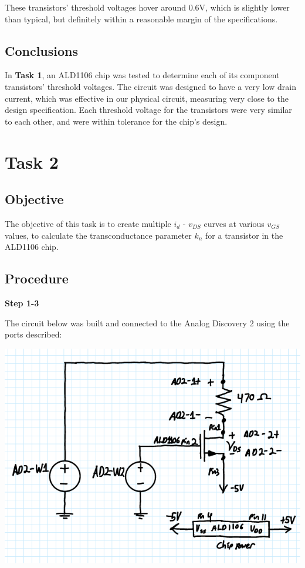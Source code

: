 \documentclass[notitlepage, 12pt]{report}  %
\begin{document}
These transistors' threshold voltages hover around 0.6V, which is slightly lower than typical, but definitely
within a reasonable margin of the specifications.\\

\subsection*{Conclusions}

\indent\indent In \textbf{Task 1}, an ALD1106 chip was tested to determine each of its component transistors' threshold voltages. 
The circuit was designed to have a very low drain current, which was effective in our physical circuit, measuring 
very close to the design specification. Each threshold voltage for the transistors were very similar to each other, 
and were within tolerance for the chip's design. \\

\section*{Task 2}

\subsection*{Objective}


\indent\indent The objective of this task is to create multiple $i_d$ - $v_{DS}$ curves at various $v_{GS}$ values, to calculate 
the transconductance parameter $k_n$ for a transistor in the ALD1106 chip.\\


\subsection*{Procedure}

\textbf{Step 1-3}

The circuit below was built and connected to the Analog Discovery 2 using the ports described:

\begin{center}
    \includegraphics[scale=0.5]{task2_circuit.png}
\end{center}
\end{document}
